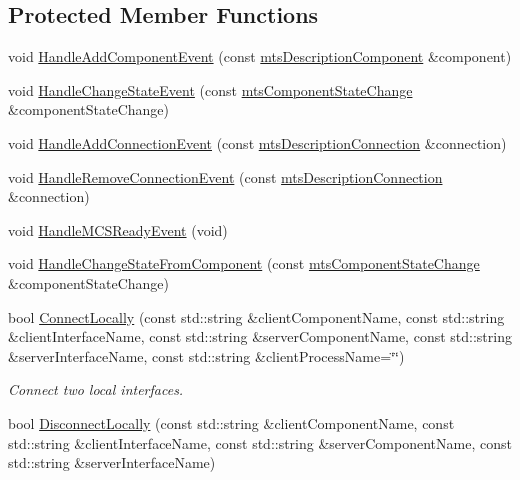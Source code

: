 \subsection*{Protected Member Functions}
\begin{DoxyCompactItemize}
\item 
void \hyperlink{classmts_manager_component_client_a74e843a393f86d5833e4ce3512d761b2}{Handle\-Add\-Component\-Event} (const \hyperlink{classmts_description_component}{mts\-Description\-Component} \&component)
\item 
void \hyperlink{classmts_manager_component_client_a17e48a1d9081a4d62f293787ac37c5b4}{Handle\-Change\-State\-Event} (const \hyperlink{classmts_component_state_change}{mts\-Component\-State\-Change} \&component\-State\-Change)
\item 
void \hyperlink{classmts_manager_component_client_a490ba873a6c3779591f92481c5470af3}{Handle\-Add\-Connection\-Event} (const \hyperlink{classmts_description_connection}{mts\-Description\-Connection} \&connection)
\item 
void \hyperlink{classmts_manager_component_client_afa0aeaa9dbd504c937c7ca945733ee66}{Handle\-Remove\-Connection\-Event} (const \hyperlink{classmts_description_connection}{mts\-Description\-Connection} \&connection)
\item 
void \hyperlink{classmts_manager_component_client_ad271d0982a619c54ae9a2c92bed9b200}{Handle\-M\-C\-S\-Ready\-Event} (void)
\item 
void \hyperlink{classmts_manager_component_client_a63ecbac11f325540b97148984ab9ac54}{Handle\-Change\-State\-From\-Component} (const \hyperlink{classmts_component_state_change}{mts\-Component\-State\-Change} \&component\-State\-Change)
\item 
bool \hyperlink{classmts_manager_component_client_a0dc5f4b41be4b09a845f1c866a6f9ef4}{Connect\-Locally} (const std\-::string \&client\-Component\-Name, const std\-::string \&client\-Interface\-Name, const std\-::string \&server\-Component\-Name, const std\-::string \&server\-Interface\-Name, const std\-::string \&client\-Process\-Name=\char`\"{}\char`\"{})
\begin{DoxyCompactList}\small\item\em Connect two local interfaces. \end{DoxyCompactList}\item 
bool \hyperlink{classmts_manager_component_client_a8f66d717b2e966b375ac848e6661a459}{Disconnect\-Locally} (const std\-::string \&client\-Component\-Name, const std\-::string \&client\-Interface\-Name, const std\-::string \&server\-Component\-Name, const std\-::string \&server\-Interface\-Name)

\end{DoxyCompactItemize}
